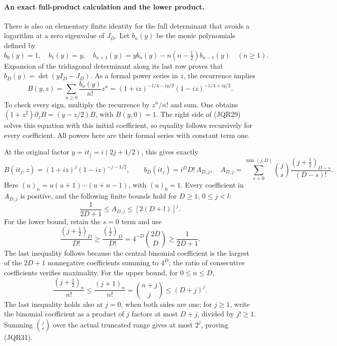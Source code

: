\paragraph{An exact full-product calculation and the lower product.}
There is also an elementary finite identity for the full determinant
that avoids a logarithm at a zero eigenvalue of \(J_D\).
Let \(b_n(y)\) be the monic polynomials defined by
\[
 b_0(y)=1,\quad b_1(y)=y,\quad
 b_{n+1}(y)=y b_n(y)-n(n-\tfrac12)b_{n-1}(y)\quad(n\geq1).
 \tag{JQR28}
\]
Expansion of the tridiagonal determinant along its last row proves
that \(b_D(y)=\det(yI_D-J_D)\).  As a formal power series in \(z\),
the recurrence implies
\[
 B(y,z)=\sum_{n\geq0}\frac{b_n(y)}{n!}z^n
  =(1+iz)^{-1/4-iy/2}(1-iz)^{-1/4+iy/2}.
 \tag{JQR29}
\]
To check every sign, multiply the recurrence by \(z^n/n!\) and
sum.  One obtains
\((1+z^2)\partial_z B=(y-z/2)B\), with \(B(y,0)=1\).
The right side of (JQR29) solves this equation with this initial
coefficient, so equality follows recursively for every coefficient.
All powers here are their formal series with constant term one.

At the original factor \(y=it_j=i(2j+1/2)\), this gives exactly
\[
 B(it_j,z)=(1+iz)^j(1-iz)^{-j-1/2},\qquad
 b_D(it_j)=i^D D!\,A_{D,j},
 \quad
 A_{D,j}=\sum_{s=0}^{\min(j,D)}
   \binom js\frac{(j+\tfrac12)_{D-s}}{(D-s)!}.
 \tag{JQR30}
\]
Here \((u)_n=u(u+1)\cdots(u+n-1)\), with \((u)_0=1\).
Every coefficient in \(A_{D,j}\) is positive, and the following
finite bounds hold for \(D\geq1\), \(0\leq j<l\):
\[
 \frac1{2D+1}\leq A_{D,j}\leq[2(D+l)]^j.
 \tag{JQR31}
\]
For the lower bound, retain the \(s=0\) term and use
\[
 \frac{(j+\tfrac12)_D}{D!}\geq
 \frac{(\tfrac12)_D}{D!}
 =4^{-D}\binom{2D}{D}\geq\frac1{2D+1}.
 \tag{JQR32}
\]
The last inequality follows because the central binomial coefficient
is the largest of the \(2D+1\) nonnegative coefficients summing to
\(4^D\); the ratio of consecutive coefficients verifies maximality.
For the upper bound, for \(0\leq n\leq D\),
\[
 \frac{(j+\tfrac12)_n}{n!}
 \leq\frac{(j+1)_n}{n!}=\binom{n+j}{j}
 \leq(D+j)^j.
 \tag{JQR33}
\]
The last inequality holds also at \(j=0\), when both sides are one;
for \(j\geq1\), write the binomial coefficient as a product of \(j\)
factors at most \(D+j\), divided by \(j!\geq1\).
Summing \(\binom js\) over the actual truncated range gives at most
\(2^j\), proving (JQR31).

